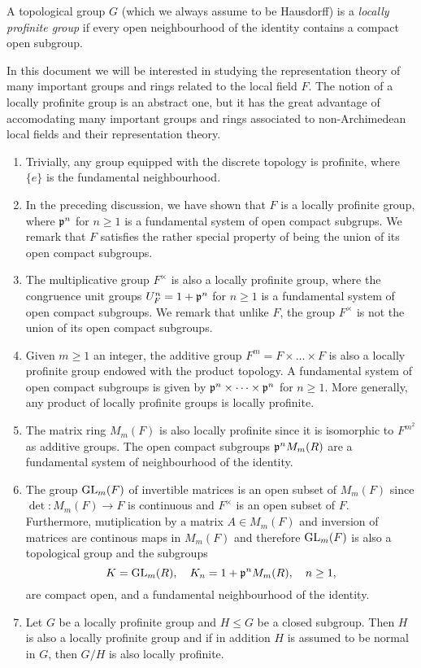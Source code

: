 \begin{defn}\label{loc_prof_grp}
    A topological group $G$ (which we always assume to be Hausdorff) is a \textit{locally profinite group} if every open neighbourhood of the identity contains a compact open subgroup. 
\end{defn}

In this document we will be interested in studying the representation theory of many important groups and rings related to the local field $F$. The notion of a locally profinite group is an abstract one, but it has the great advantage of accomodating many important groups and rings associated to non-Archimedean local fields and their representation theory.

\begin{examples} \label{example_prof_groups}

    \begin{enumerate}
        \item Trivially, any group equipped with the discrete topology is profinite, where $\{e\}$ is the fundamental neighbourhood.
        \item In the preceding discussion, we have shown that $F$ is a locally profinite group, where $\mathfrak{p}^n$ for $n\geq1$ is a fundamental system of open compact subgrups. We remark that $F$ satisfies the rather special property of being the union of its open compact subgroups. %
        \item The multiplicative group $F^{\times}$ is also a locally profinite group, where the congruence unit groups $U_F^n=1+\mathfrak{p}^n$ for $n\geq1$ is a fundamental system of open compact subgroups. We remark that unlike $F$, the group $F^{\times}$ is not the union of its open compact subgroups.
        \item Given $m\geq1$ an integer, the additive group $F^m=F\times\dots\times F$ is also a locally profinite group endowed with the product topology. A fundamental system of open compact subgroups is given by $\mathfrak{p}^{n}\times\dots\times\mathfrak{p}^{n}$ for $n\geq1$. More generally, any product of locally profinite groups is locally profinite.
        \item The matrix ring $M_m(F)$ is also locally profinite since it is isomorphic to $F^{m^2}$ as additive groups. The open compact subgroups $\mathfrak{p}^n M_m(R)$ are a fundamental system of neighbourhood of the identity.
        \item The group $\mathrm{GL}_m(F)$ of invertible matrices is an open subset of $M_m(F)$ since $\det:M_m(F)\rightarrow F$ is continuous and $F^{\times}$ is an open subset of $F$. Furthermore, mutiplication by a matrix $A\in M_m(F)$ and inversion of matrices are continous maps in $M_m(F)$ and therefore $\mathrm{GL}_m(F)$ is also a topological group and the subgroups
        $$K=\mathrm{GL}_m(R),\quad K_n=1+\mathfrak{p}^nM_m(R),\quad n\geq 1,$$
        are compact open, and a fundamental neighbourhood of the identity.
        \item Let $G$ be a locally profinite group and $H\leq G$ be a closed subgroup. Then $H$ is also a locally profinite group and if in addition $H$ is assumed to be normal in $G$, then $G/H$ is also locally profinite. 
        

\end{enumerate}
\end{examples}
